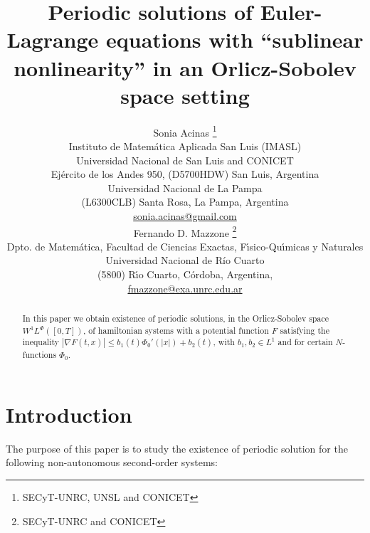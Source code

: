 \documentclass[twoside]{article}
\title{Periodic solutions of 
Euler-Lagrange equations with ``sublinear nonlinearity'' in an Orlicz-Sobolev space setting}
\author{Sonia Acinas \thanks{SECyT-UNRC, UNSL and CONICET}\\
Instituto de Matem\'atica Aplicada San Luis (IMASL)\\ 
Universidad Nacional de San Luis and CONICET\\
Ej\'ercito de los Andes 950,
(D5700HDW) San Luis, Argentina\\
Universidad Nacional de La Pampa\\
(L6300CLB) Santa Rosa, La Pampa, Argentina\\
\url{sonia.acinas@gmail.com}\\[3mm]
Fernando D. Mazzone \thanks{SECyT-UNRC and CONICET}\\
Dpto. de Matem\'atica, Facultad de Ciencias Exactas, F\'{\i}sico-Qu\'{\i}micas y Naturales\\
Universidad Nacional de R\'{i}o Cuarto\\
(5800) R\'{\i}o Cuarto, C\'ordoba, Argentina,\\
\url{fmazzone@exa.unrc.edu.ar}
}
\date{}
\theoremstyle{remark}
\newcommand{\lphi}{L^{\Phi}}
\newcommand{\wphi}{W^{1}\lphi}
\renewcommand{\leq}{\leqslant}
\begin{document}
\maketitle
%
\begingroup%
    \renewcommand{\thefootnote}{}%
    \endgroup
%
%
%
%

\begin{abstract}

In this paper we obtain existence of periodic solutions, in the Orlicz-Sobolev space $\wphi([0,T])$, of hamiltonian systems with a potential  function $F$ satisfying the inequality  $|\nabla F(t,x)|\leq b_1(t) \Phi_0'(|x|)+b_2(t)$, with    $b_1, b_2\in L^1$ and for certain $N$-functions $\Phi_0$.

\end{abstract}




\pagestyle{fancy} \headheight 35pt \fancyhead{} \fancyfoot{}

\fancyfoot[C]{\thepage}  \fancyhead[CO]{\nouppercase{\section}}

\fancyhead[CO]{\nouppercase{\leftmark}}






\section{Introduction}
The purpose of this paper is to study the existence  of periodic solution for the
following non-autonomous second-order systems:
\end{document}
